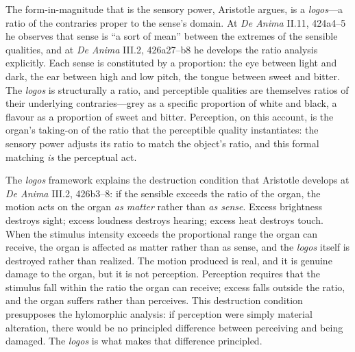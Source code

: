 \documentclass[12pt]{article}
\begin{document}
The form-in-magnitude that is the sensory power, Aristotle argues, is a \textit{logos}---a ratio of the contraries proper to the sense's domain. At \textit{De Anima} II.11, 424a4--5 he observes that sense is ``a sort of mean'' between the extremes of the sensible qualities, and at \textit{De Anima} III.2, 426a27--b8 he develops the ratio analysis explicitly. Each sense is constituted by a proportion: the eye between light and dark, the ear between high and low pitch, the tongue between sweet and bitter. The \textit{logos} is structurally a ratio, and perceptible qualities are themselves ratios of their underlying contraries---grey as a specific proportion of white and black, a flavour as a proportion of sweet and bitter. Perception, on this account, is the organ's taking-on of the ratio that the perceptible quality instantiates: the sensory power adjusts its ratio to match the object's ratio, and this formal matching \textit{is} the perceptual act.

The \textit{logos} framework explains the destruction condition that Aristotle develops at \textit{De Anima} III.2, 426b3--8: if the sensible exceeds the ratio of the organ, the motion acts on the organ \textit{as matter} rather than \textit{as sense}. Excess brightness destroys sight; excess loudness destroys hearing; excess heat destroys touch. When the stimulus intensity exceeds the proportional range the organ can receive, the organ is affected as matter rather than as sense, and the \textit{logos} itself is destroyed rather than realized. The motion produced is real, and it is genuine damage to the organ, but it is not perception. Perception requires that the stimulus fall within the ratio the organ can receive; excess falls outside the ratio, and the organ suffers rather than perceives. This destruction condition presupposes the hylomorphic analysis: if perception were simply material alteration, there would be no principled difference between perceiving and being damaged. The \textit{logos} is what makes that difference principled.
\end{document}
